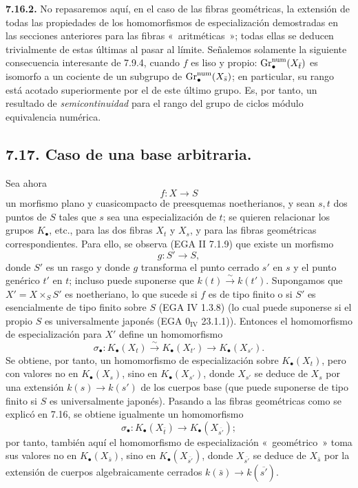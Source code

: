 \textbf{7.16.2.} No repasaremos aquí, en el caso de las fibras geométricas, la extensión de todas las propiedades de los homomorfismos de especialización demostradas en las secciones anteriores para las fibras «~aritméticas~»; todas ellas se deducen trivialmente de estas últimas al pasar al límite. Señalemos solamente la siguiente consecuencia interesante de 7.9.4, cuando \(f\) es liso y propio: \(\operatorname{Gr}_\bullet^{\mathrm{num}}(X_{\bar t})\) es isomorfo a un cociente de un subgrupo de \(\operatorname{Gr}_\bullet^{\mathrm{num}}(X_{\bar s})\); en particular, su rango está acotado superiormente por el de este último grupo. Es, por tanto, un resultado de \emph{semicontinuidad} para el rango del grupo de ciclos módulo equivalencia numérica.

\subsection*{7.17. Caso de una base arbitraria.}
Sea ahora
\[
  f:X\longrightarrow S
\]
un morfismo plano y cuasicompacto de preesquemas noetherianos, y sean \(s,t\) dos puntos de \(S\) tales que \(s\) sea una especialización de \(t\); se quieren relacionar los grupos \(K_\bullet\), etc., para las dos fibras \(X_t\) y \(X_s\), y para las fibras geométricas correspondientes. Para ello, se observa (EGA II 7.1.9) que existe un morfismo
\[
  g:S'\longrightarrow S,
\]
donde \(S'\) es un rasgo y donde \(g\) transforma el punto cerrado \(s'\) en \(s\) y el punto genérico \(t'\) en \(t\); incluso puede suponerse que \(k(t)\xrightarrow{\sim}k(t')\). Supongamos que \(X'=X\times_S S'\) es noetheriano, lo que sucede si \(f\) es de tipo finito o si \(S'\) es esencialmente de tipo finito sobre \(S\) (EGA IV 1.3.8) (lo cual puede suponerse si el propio \(S\) es universalmente japonés (EGA \(0_{\mathrm{IV}}\) 23.1.1)). Entonces el homomorfismo de especialización para \(X'\) define un homomorfismo
\begin{equation}\tag{7.17.1}
  \sigma_\bullet:K_\bullet(X_t)\xrightarrow{\sim}K_\bullet(X_{t'})
  \longrightarrow K_\bullet(X_{s'}).
\end{equation}
Se obtiene, por tanto, un homomorfismo de especialización sobre \(K_\bullet(X_t)\), pero con valores no en \(K_\bullet(X_s)\), sino en \(K_\bullet(X_{s'})\), donde \(X_{s'}\) se deduce de \(X_s\) por una extensión \(k(s)\to k(s')\) de los cuerpos base (que puede suponerse de tipo finito si \(S\) es universalmente japonés). Pasando a las fibras geométricas como se explicó en 7.16, se obtiene igualmente un homomorfismo
\begin{equation}\tag{7.17.2}
  \sigma_\bullet:K_\bullet(X_{\bar t})\longrightarrow K_\bullet(X_{\overline{s'}});
\end{equation}
por tanto, también aquí el homomorfismo de especialización «~geométrico~» toma sus valores no en \(K_\bullet(X_{\bar s})\), sino en \(K_\bullet(X_{\overline{s'}})\), donde \(X_{\overline{s'}}\) se deduce de \(X_{\bar s}\) por la extensión de cuerpos algebraicamente cerrados \(k(\bar s)\to k(\overline{s'})\).

